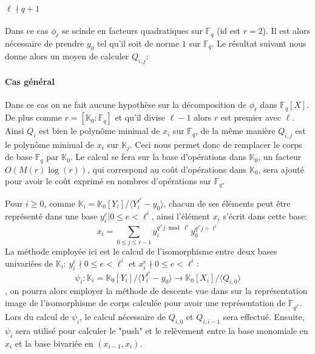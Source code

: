 \documentclass[10pt,a4paper]{book}
\theoremstyle{plain}
\theoremstyle{definition}
\theoremstyle{definition}
\theoremstyle{definition}
\newtheorem{prop}[thm]{Proposition}
\theoremstyle{definition}
\theoremstyle{remark}
\theoremstyle{remark}
\begin{document}
\paragraph{$\ell \nmid q+1$}
Dans ce cas $\phi_{\ell}$ se scinde en facteurs quadratiques sur $\mathbb{F}_q$ (id est $r=2$). Il est alors nécessaire de prendre $y_0$ tel qu'il soit de norme $1$ sur $\mathbb{F}_q$. Le résultat suivant nous donne alors un moyen de calculer $Q_{i,j}$:
%

\paragraph{Cas général}
Dans ce cas on ne fait aucune hypothèse sur la décomposition de $\phi_{\ell}$ dans $\mathbb{F}_q[X]$. De plus comme $r=[\mathbb{K}_0:\mathbb{F}_q]$ et qu'il divise $\ell-1$ alors $r$ est premier avec $\ell$. Ainsi $Q_i$ est bien le polynôme minimal de $x_i$ sur $\mathbb{F}_q$, de la même manière $Q_{i,j}$ est le polynôme minimal de $x_i$ sur $\mathbb{K}_j$. Ceci nous permet donc de remplacer le corps de base $\mathbb{F}_q$ par $\mathbb{K}_0$. Le calcul se fera sur la base d'opérations dans $\mathbb{K}_0$, un facteur $O(M(r)\log(r))$, qui correspond au coût d'opérations dans $\mathbb{K}_0$, sera ajouté pour avoir le coût exprimé en nombres d'opérations sur $\mathbb{F}_q$.


Pour $i \geqslant 0$, comme $\mathbb{K}_i=\mathbb{K}_0[Y_i]/\langle Y_i^{\ell^i} - y_0 \rangle$, chacun de ses éléments peut être représenté dans une base ${y_i^e | 0 \leqslant e < \ell^i }$, ainsi l'élément $x_i$ s'écrit dans cette base:
\begin{equation*}
x_i= \sum_{0 \leqslant j \leqslant r-1}y_i^{q^{\ell^i}j \bmod \ell^i}y_0^{q^{\ell^i}j \div \ell^i}
\end{equation*}
La méthode employée ici est le calcul de l'isomorphisme entre deux bases univariées de $\mathbb{K}_i$: ${y_i^e \nmid 0 \leqslant e < \ell^i}$ et ${x_i^e \nmid 0 \leqslant e < \ell^i}$:
\begin{equation*}
\psi_i: \mathbb{K}_i=\mathbb{K}_0[Y_i]/\langle Y_i^{\ell^i}-y_0 \rangle \to \mathbb{K}_0[X_i]/\langle Q_{i,0} \rangle
\end{equation*}
 , on pourra alors employer la méthode de descente vue dans \cite{Shoup88} sur la représentation image de l'isomorphisme de corps calculée pour avoir une représentation de $\mathbb{F}_{q^{\ell^i}}$. Lors du calcul de $\psi_i$, le calcul nécessaire de $Q_{i,0}$ et $Q_{i,i-1}$ sera effectué. Ensuite, $\psi_i$ sera utilisé pour calculer le "push" et le relèvement entre la base monomiale en $x_i$ et la base bivariée en $(x_{i-1},x_i)$.
 
\end{document}
